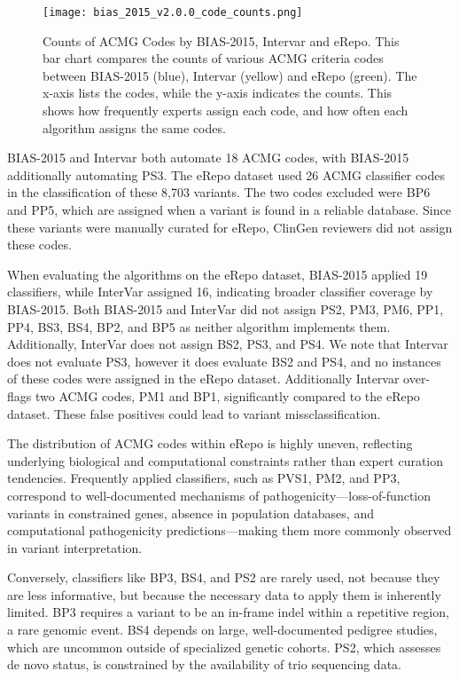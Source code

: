 \documentclass[unnumsec,webpdf,contemporary,large]{oup-authoring-template}
\theoremstyle{thmstyleone}
\theoremstyle{thmstyletwo}
\theoremstyle{thmstylethree}
\begin{document}
\begin{figure}[!ht]
\centering
\texttt{[image: bias\_2015\_v2.0.0\_code\_counts.png]}
\caption{Counts of ACMG Codes by BIAS-2015, Intervar and eRepo. This bar chart compares the counts of various ACMG criteria codes between BIAS-2015 (blue), Intervar (yellow) and eRepo (green). The x-axis lists the codes, while the y-axis indicates the counts. This shows how frequently experts assign each code, and how often each algorithm assigns the same codes.}
\label{fig:code_counts_chart}
\end{figure}
BIAS-2015 and Intervar both automate 18 ACMG codes, with BIAS-2015 additionally automating PS3. The eRepo dataset used 26 ACMG classifier codes in the classification of these 8,703 variants. The two codes excluded were BP6 and PP5, which are assigned when a variant is found in a reliable database. Since these variants were manually curated for eRepo, ClinGen reviewers did not assign these codes. 

When evaluating the algorithms on the eRepo dataset, BIAS-2015 applied 19 classifiers, while InterVar assigned 16, indicating broader classifier coverage by BIAS-2015. Both BIAS-2015 and InterVar did not assign PS2, PM3, PM6, PP1, PP4, BS3, BS4, BP2, and BP5 as neither algorithm implements them. Additionally, InterVar does not assign BS2, PS3, and PS4. We note that Intervar does not evaluate PS3, however it does evaluate BS2 and PS4, and no instances of these codes were assigned in the eRepo dataset. Additionally Intervar over-flags two ACMG codes, PM1 and BP1, significantly compared to the eRepo dataset. These false positives could lead to variant missclassification.

The distribution of ACMG codes within eRepo is highly uneven, reflecting underlying biological and computational constraints rather than expert curation tendencies. Frequently applied classifiers, such as PVS1, PM2, and PP3, correspond to well-documented mechanisms of pathogenicity—loss-of-function variants in constrained genes, absence in population databases, and computational pathogenicity predictions—making them more commonly observed in variant interpretation. 

Conversely, classifiers like BP3, BS4, and PS2 are rarely used, not because they are less informative, but because the necessary data to apply them is inherently limited. BP3 requires a variant to be an in-frame indel within a repetitive region, a rare genomic event. BS4 depends on large, well-documented pedigree studies, which are uncommon outside of specialized genetic cohorts. PS2, which assesses de novo status, is constrained by the availability of trio sequencing data.
\end{document}
